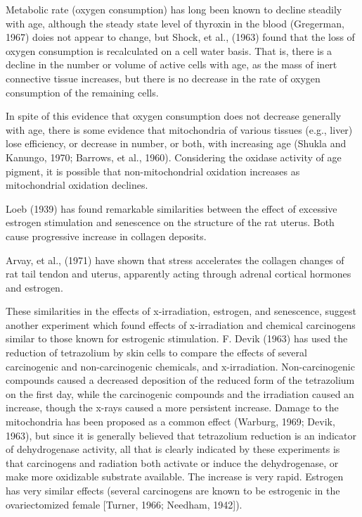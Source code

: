 Metabolic rate (oxygen consumption) has long been known to decline steadily with age, although the steady state level of thyroxin in the blood (Gregerman, 1967) doies not appear to change, but
Shock, et al., (1963) found that the loss of oxygen consumption is recalculated on a cell water basis. That is, there is a decline in the number or volume of active cells with age, as the mass of
inert connective tissue increases, but there is no decrease in the rate of oxygen consumption of the remaining cells.

In spite of this evidence that oxygen consumption does not decrease generally with age, there is some evidence that mitochondria of various tissues (e.g., liver) lose efficiency, or decrease in number, or both, with
increasing age (Shukla and Kanungo, 1970; Barrows, et al., 1960). Considering the oxidase activity of age pigment, it is possible that non-mitochondrial oxidation increases as mitochondrial oxidation declines.

Loeb (1939) has found remarkable similarities between the effect of excessive estrogen stimulation and senescence on the structure of the rat uterus. Both cause progressive increase in collagen deposits.

Arvay, et al., (1971) have shown that stress accelerates the collagen changes of rat tail tendon and uterus, apparently acting through adrenal cortical hormones and estrogen.

These similarities in the effects of x-irradiation, estrogen, and senescence, suggest another experiment which found effects of x-irradiation and chemical carcinogens similar to those known
for estrogenic stimulation. F. Devik (1963) has used the reduction of tetrazolium by skin cells to compare the effects of several carcinogenic and non-carcinogenic chemicals, and x-irradiation. Non-carcinogenic
compounds caused a decreased deposition of the reduced form of the tetrazolium on the first day, while the carcinogenic compounds and the irradiation caused an increase, though
the x-rays caused a more persistent increase. Damage to the mitochondria has been proposed as a common effect (Warburg, 1969; Devik, 1963), but since it is generally believed that tetrazolium reduction is
an indicator of dehydrogenase activity, all that is clearly indicated by these experiments is that carcinogens and radiation both activate or induce the dehydrogenase, or make more
oxidizable substrate available. The increase is very rapid. Estrogen has very similar effects (several carcinogens are known to be estrogenic in the ovariectomized female [Turner, 1966; Needham, 1942]).

